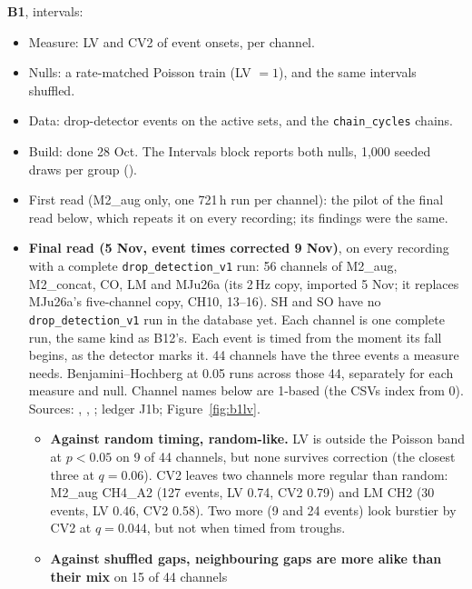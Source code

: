 \begin{instructions}
\textbf{B1}, intervals:
\begin{itemize}
  \item Measure: LV \cite{shinomoto2003lv} and CV2 \cite{holt1996cv2} of event onsets, per channel.
  \item Nulls: a rate-matched Poisson train (LV $=1$), and the same intervals shuffled.
  \item Data: drop-detector events on the active sets, and the \texttt{chain\_cycles} chains.
  \item Build: done 28 Oct. The Intervals block reports both nulls, 1,000 seeded draws per group
        ().
  \item First read (M2\_aug only, one 721\,h run per channel): the pilot of the final read below, which repeats it on
        every recording; its findings were the same.
  \item \textbf{Final read (5 Nov, event times corrected 9 Nov)}, on every recording with a complete
        \texttt{drop\_detection\_v1} run: 56 channels of M2\_aug, M2\_concat, CO, LM and MJu26a (its 2\,Hz copy, imported
        5 Nov; it replaces MJu26a's five-channel copy, CH10, 13--16). SH and SO have no \texttt{drop\_detection\_v1} run
        in the database yet. Each channel is one complete run, the same kind as B12's. Each event is timed from the
        moment its fall begins, as the detector marks it. 44 channels have the three events a measure needs.
        Benjamini--Hochberg at 0.05 runs across those 44, separately for each measure and null. Channel names below are
        1-based (the CSVs index from 0). Sources: ,
        , ; ledger
        J1b; Figure~\ref{fig:b1lv}.
        \begin{itemize}
          \item \textbf{Against random timing, random-like.} LV is outside the Poisson band at $p<0.05$ on 9 of 44
                channels, but none survives correction (the closest three at $q=0.06$). CV2 leaves two channels more
                regular than random: M2\_aug CH4\_A2 (127 events, LV 0.74, CV2 0.79) and LM CH2 (30 events, LV 0.46,
                CV2 0.58). Two more (9 and 24 events) look burstier by CV2 at $q=0.044$, but not when timed from troughs.
          \item \textbf{Against shuffled gaps, neighbouring gaps are more alike than their mix} on 15 of 44 channels

\end{itemize}
\end{itemize}
\end{instructions}
